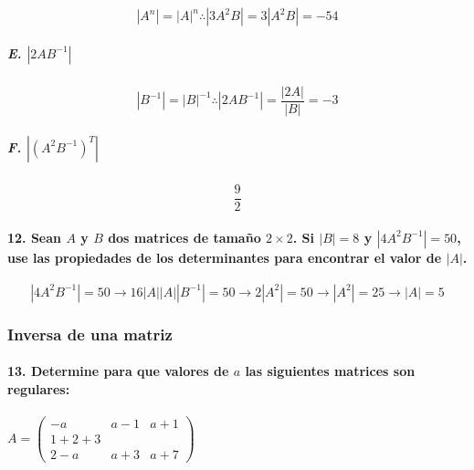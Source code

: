 \documentclass[
]{article}
\begin{document}
\[
|A^n| = |A|^n \therefore |3A^2B| = 3|A^2B| = -54
\]

\hypertarget{e.-2ab-1}{%
\subparagraph{\texorpdfstring{E.
\(|2AB^{-1}|\)}{E. \textbar2AB\^{}\{-1\}\textbar{}}}\label{e.-2ab-1}}

\[
|B^{-1}| = |B|^{-1} \therefore |2AB^{-1}| = \frac{|2A|}{|B|} = -3
\]

\hypertarget{f.-a2b-1t}{%
\subparagraph{\texorpdfstring{F.
\(|(A^2B^{-1})^T|\)}{F. \textbar(A\^{}2B\^{}\{-1\})\^{}T\textbar{}}}\label{f.-a2b-1t}}

\[
\frac{9}{2}
\]

\hypertarget{sean-a-y-b-dos-matrices-de-tamauxf1o-2times2.-si-b-8-y-4a2b-1-50-use-las-propiedades-de-los-determinantes-para-encontrar-el-valor-de-a.}{%
\paragraph{\texorpdfstring{12. Sean \(A\) y \(B\) dos matrices de tamaño
\(2\times2\). Si \(|B| = 8\) y \(|4A^2B^{-1}| = 50\), use las
propiedades de los determinantes para encontrar el valor de
\(|A|\).}{12. Sean A y B dos matrices de tamaño 2\textbackslash times2. Si \textbar B\textbar{} = 8 y \textbar4A\^{}2B\^{}\{-1\}\textbar{} = 50, use las propiedades de los determinantes para encontrar el valor de \textbar A\textbar.}}\label{sean-a-y-b-dos-matrices-de-tamauxf1o-2times2.-si-b-8-y-4a2b-1-50-use-las-propiedades-de-los-determinantes-para-encontrar-el-valor-de-a.}}

\[
|4A^2B^{-1}| = 50 \rightarrow 16|A||A||B^{-1}| = 50 \rightarrow 2|A^2| = 50 \rightarrow |A^2| = 25 \rightarrow |A| = 5
\]

\hypertarget{inversa-de-una-matriz}{%
\subsubsection{Inversa de una matriz}\label{inversa-de-una-matriz}}

\hypertarget{determine-para-que-valores-de-a-las-siguientes-matrices-son-regulares}{%
\paragraph{\texorpdfstring{13. Determine para que valores de \(a\) las
siguientes matrices son
regulares:}{13. Determine para que valores de a las siguientes matrices son regulares:}}\label{determine-para-que-valores-de-a-las-siguientes-matrices-son-regulares}}

\hypertarget{a-beginpmatrix-a-a-1-a-1-1-2-3-2-a-a3-a7endpmatrix}{%
\subparagraph{\texorpdfstring{\(A = \begin{pmatrix}-a & a-1 & a + 1 \\ 1 + 2 +3 \\2-a & a+3 & a+7\end{pmatrix}\)}{A = \textbackslash begin\{pmatrix\}-a \& a-1 \& a + 1 \textbackslash\textbackslash{} 1 + 2 +3 \textbackslash\textbackslash2-a \& a+3 \& a+7\textbackslash end\{pmatrix\}}}\label{a-beginpmatrix-a-a-1-a-1-1-2-3-2-a-a3-a7endpmatrix}}
\end{document}
